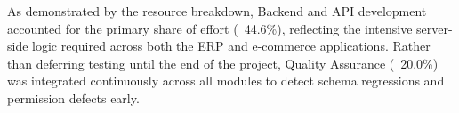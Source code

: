 \begin{table}[H]
\centering
\renewcommand{\arraystretch}{1.4}
\caption{Total Resource (Role) Allocation Summary}
\label{tab:resource-summary}
\end{table}

As demonstrated by the resource breakdown, Backend and API development accounted for the primary share of effort (~44.6\%), reflecting the intensive server-side logic required across both the ERP and e-commerce applications. Rather than deferring testing until the end of the project, Quality Assurance (~20.0\%) was integrated continuously across all modules to detect schema regressions and permission defects early.